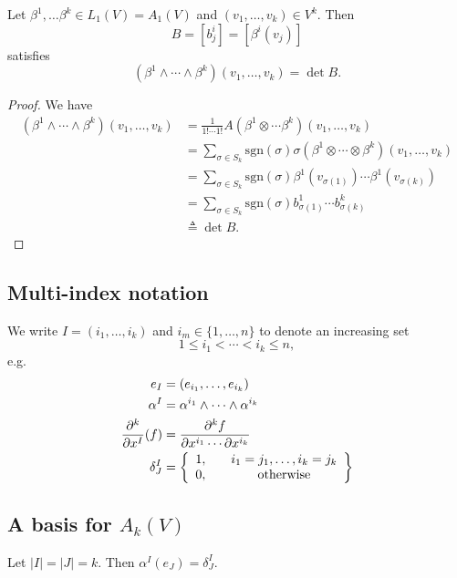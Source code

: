 \begin{lemma}
Let $\beta^1, \dots \beta^k \in L_1(V) = A_1(V)$ and
$(v_1, \dots, v_k) \in V^k$. Then
$$
B = [b_j^i] = [\beta^i(v_j)]
$$
satisfies
$$
  (\beta^1 \wedge \cdots \wedge \beta^k)(v_1, \dots, v_k)
= \det B.
$$
\end{lemma}
\begin{proof}
We have
\begin{align*}
   (\beta^1 \wedge \cdots \wedge \beta^k)(v_1, \dots, v_k)
&= \frac{1}{1! \cdots 1!}
   A(\beta^1 \otimes \cdots \beta^k)(v_1, \dots, v_k) \\
&= \sum_{\sigma \in S_k}
     \mathrm{sgn}(\sigma)
     \sigma(\beta^1 \otimes \cdots \otimes \beta^k)
       (v_1, \dots, v_k) \\
&= \sum_{\sigma \in S_k}
     \mathrm{sgn}(\sigma)
     \beta^1(v_{\sigma(1)}) \cdots \beta^1(v_{\sigma(k)}) \\
&= \sum_{\sigma \in S_k}
     \mathrm{sgn}(\sigma)
     b^1_{\sigma(1)} \cdots b^k_{\sigma(k)} \\
&\triangleq \det B.
\end{align*}
\end{proof}

\subsection*{Multi-index notation}
We write $I = (i_1, \dots, i_k)$ and $i_m \in \{1, \dots, n\}$ to
denote an increasing set
$$
1 \leq i_1 < \cdots < i_k \leq n,
$$
e.g.
\begin{align*}
   e_I
&= (e_{i_1}, \dots, e_{i_k}) \\
   \alpha^I
&= \alpha^{i_1} \wedge \cdots \wedge \alpha^{i_k} \\
   \frac{\partial^k}{\partial x^I}(f)
&= \frac{\partial^k f}
        {\partial x^{i_1} \cdots \partial x^{i_k}} \\
   \delta^{I}_J
&= \left\{
     \begin{array}{c c}
       1, & \quad i_1 = j_1, \dots, i_k = j_k \\
       0, & \quad \text{otherwise}
     \end{array}
   \right\}
\end{align*}

\subsection*{A basis for $A_k(V)$}

\begin{lemma}
Let $|I| = |J| = k$. Then $\alpha^I(e_J) = \delta^I_J$.
\end{lemma}

